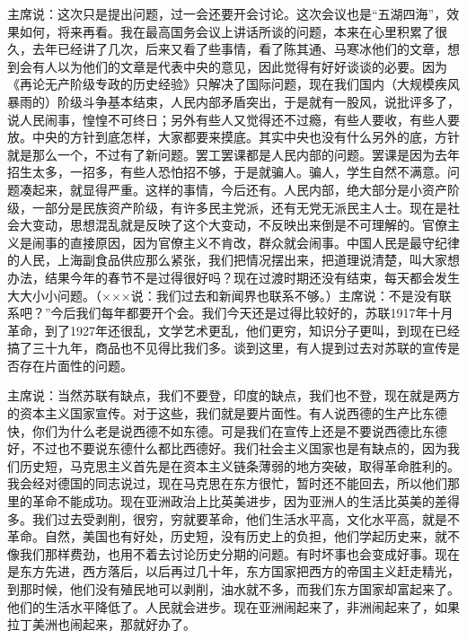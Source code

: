 主席说：这次只是提出问题，过一会还要开会讨论。这次会议也是“五湖四海”，效果如何，将来再看。我在最高国务会议上讲话所谈的问题，本来在心里积累了很久，去年已经讲了几次，后来又看了些事情，看了陈其通、马寒冰他们的文章，想到会有人以为他们的文章是代表中央的意见，因此觉得有好好谈谈的必要。因为《再论无产阶级专政的历史经验》只解决了国际问题，现在我们国内（大规模疾风暴雨的）阶级斗争基本结束，人民内部矛盾突出，于是就有一股风，说批评多了，说人民闹事，惶惶不可终日；另外有些人又觉得还不过瘾，有些人要收，有些人要放。中央的方针到底怎样，大家都要来摸底。其实中央也没有什么另外的底，方针就是那么一个，不过有了新问题。罢工罢课都是人民内部的问题。罢课是因为去年招生太多，一招多，有些人恐怕招不够，于是就骗人。骗人，学生自然不满意。问题凑起来，就显得严重。这样的事情，今后还有。人民内部，绝大部分是小资产阶级，一部分是民族资产阶级，有许多民主党派，还有无党无派民主人士。现在是社会大变动，思想混乱就是反映了这个大变动，不反映出来倒是不可理解的。官僚主义是闹事的直接原因，因为官僚主义不肯改，群众就会闹事。中国人民是最守纪律的人民，上海副食品供应那么紧张，我们把情况摆出来，把道理说清楚，叫大家想办法，结果今年的春节不是过得很好吗？现在过渡时期还没有结束，每天都会发生大大小小问题。（×××说：我们过去和新闻界也联系不够。）主席说：不是没有联系吧？”今后我们每年都要开个会。我们今天还是过得比较好的，苏联1917年十月革命，到了1927年还很乱，文学艺术更乱，他们更穷，知识分子更叫，到现在已经搞了三十九年，商品也不见得比我们多。谈到这里，有人提到过去对苏联的宣传是否存在片面性的问题。

主席说：当然苏联有缺点，我们不要登，印度的缺点，我们也不登，现在就是两方的资本主义国家宣传。对于这些，我们就是要片面性。有人说西德的生产比东德快，你们为什么老是说西德不如东德。可是我们在宣传上还是不要说西德比东德好，不过也不要说东德什么都比西德好。我们社会主义国家也是有缺点的，因为我们历史短，马克思主义首先是在资本主义链条薄弱的地方突破，取得革命胜利的。我会经对德国的同志说过，现在马克思在东方很忙，暂时还不能回去，所以他们那里的革命不能成功。现在亚洲政治上比英美进步，因为亚洲人的生活比英美的差得多。我们过去受剥削，很穷，穷就要革命，他们生活水平高，文化水平高，就是不革命。自然，美国也有好处，历史短，没有历史上的负担，他们学起历史来，就不像我们那样费劲，也用不着去讨论历史分期的问题。有时坏事也会变成好事。现在是东方先进，西方落后，以后再过几十年，东方国家把西方的帝国主义赶走精光，到那时候，他们没有殖民地可以剥削，油水就不多，而我们东方国家却富起来了。他们的生活水平降低了。人民就会进步。现在亚洲闹起来了，非洲闹起来了，如果拉丁美洲也闹起来，那就好办了。


